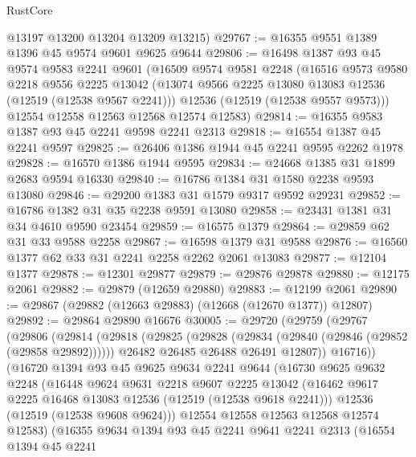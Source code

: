 \begin{lexlean}{RustCore}
\begin{coremodule}
      @13197
      @13200
      @13204
      @13209
      @13215)
@29767 := @16355 @9551 @1389 @1396 @45 @9574 @9601 @9625 @9644
@29806 := @16498
    @1387
    @93
    @45
    @9574
    @9583
    @2241
    @9601
    (@16509
      @9574
      @9581
      @2248
      (@16516
        @9573
        @9580
        @2218
        @9556
        @2225
        @13042
        (@13074 @9566 @2225 @13080 @13083 @12536 (@12519 (@12538 @9567 @2241)))
        @12536
        (@12519 (@12538 @9557 @9573)))
      @12554
      @12558
      @12563
      @12568
      @12574
      @12583)
@29814 := @16355 @9583 @1387 @93 @45 @2241 @9598 @2241 @2313
@29818 := @16554 @1387 @45 @2241 @9597
@29825 := @26406 @1386 @1944 @45 @2241 @9595 @2262 @1978
@29828 := @16570 @1386 @1944 @9595
@29834 := @24668 @1385 @31 @1899 @2683 @9594 @16330
@29840 := @16786 @1384 @31 @1580 @2238 @9593 @13080
@29846 := @29200 @1383 @31 @1579 @9317 @9592 @29231
@29852 := @16786 @1382 @31 @35 @2238 @9591 @13080
@29858 := @23431 @1381 @31 @34 @4610 @9590 @23454
@29859 := @16575 @1379
@29864 := @29859 @62 @31 @33 @9588 @2258
@29867 := @16598 @1379 @31 @9588
@29876 := @16560 @1377 @62 @33 @31 @2241 @2258 @2262 @2061 @13083
@29877 := @12104 @1377
@29878 := @12301 @29877
@29879 := @29876 @29878
@29880 := @12175 @2061
@29882 := @29879 (@12659 @29880)
@29883 := @12199 @2061
@29890 := @29867 (@29882 (@12663 @29883) (@12668 (@12670 @1377)) @12807)
@29892 := @29864 @29890 @16676
@30005 := @29720
    (@29759
      (@29767
        (@29806
          (@29814
            (@29818
              (@29825
                (@29828 (@29834 (@29840 (@29846 (@29852 (@29858 @29892))))))
                @26482
                @26485
                @26488
                @26491
                @12807))
            @16716))
        (@16720
          @1394
          @93
          @45
          @9625
          @9634
          @2241
          @9644
          (@16730
            @9625
            @9632
            @2248
            (@16448
              @9624
              @9631
              @2218
              @9607
              @2225
              @13042
              (@16462 @9617 @2225 @16468 @13083 @12536 (@12519 (@12538 @9618 @2241)))
              @12536
              (@12519 (@12538 @9608 @9624)))
            @12554
            @12558
            @12563
            @12568
            @12574
            @12583)
          (@16355
            @9634
            @1394
            @93
            @45
            @2241
            @9641
            @2241
            @2313
            (@16554
              @1394
              @45
              @2241

\end{coremodule}
\end{lexlean}
